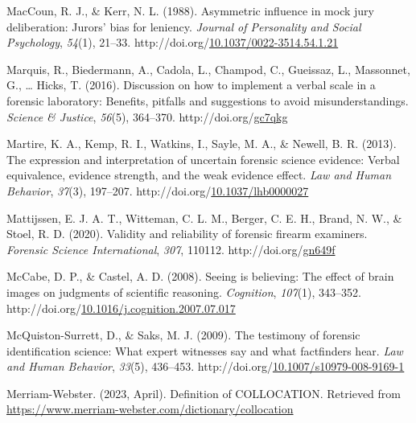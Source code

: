 \documentclass[print]{nuthesis}
\newlength{\cslhangindent}
\newenvironment{CSLReferences}[2]%
{\setlength{\parindent}{0pt}%
\everypar{\setlength{\hangindent}{\cslhangindent}}\ignorespaces}%
{\par}
\begin{document}
\begin{CSLReferences}{1}{0}
\leavevmode{}%
MacCoun, R. J., \& Kerr, N. L. (1988). Asymmetric influence in mock jury deliberation: {Jurors}' bias for leniency. \emph{Journal of Personality and Social Psychology}, \emph{54}(1), 21--33. http://doi.org/\href{https://doi.org/10.1037/0022-3514.54.1.21}{10.1037/0022-3514.54.1.21}

\leavevmode{}%
Marquis, R., Biedermann, A., Cadola, L., Champod, C., Gueissaz, L., Massonnet, G., \ldots{} Hicks, T. (2016). Discussion on how to implement a verbal scale in a forensic laboratory: {Benefits}, pitfalls and suggestions to avoid misunderstandings. \emph{Science \& Justice}, \emph{56}(5), 364--370. http://doi.org/\href{https://doi.org/gc7qkg}{gc7qkg}

\leavevmode{}%
Martire, K. A., Kemp, R. I., Watkins, I., Sayle, M. A., \& Newell, B. R. (2013). The expression and interpretation of uncertain forensic science evidence: {Verbal} equivalence, evidence strength, and the weak evidence effect. \emph{Law and Human Behavior}, \emph{37}(3), 197--207. http://doi.org/\href{https://doi.org/10.1037/lhb0000027}{10.1037/lhb0000027}

\leavevmode{}%
Mattijssen, E. J. A. T., Witteman, C. L. M., Berger, C. E. H., Brand, N. W., \& Stoel, R. D. (2020). Validity and reliability of forensic firearm examiners. \emph{Forensic Science International}, \emph{307}, 110112. http://doi.org/\href{https://doi.org/gn649f}{gn649f}

\leavevmode{}%
McCabe, D. P., \& Castel, A. D. (2008). Seeing is believing: {The} effect of brain images on judgments of scientific reasoning. \emph{Cognition}, \emph{107}(1), 343--352. http://doi.org/\href{https://doi.org/10.1016/j.cognition.2007.07.017}{10.1016/j.cognition.2007.07.017}

\leavevmode{}%
McQuiston-Surrett, D., \& Saks, M. J. (2009). The testimony of forensic identification science: {What} expert witnesses say and what factfinders hear. \emph{Law and Human Behavior}, \emph{33}(5), 436--453. http://doi.org/\href{https://doi.org/10.1007/s10979-008-9169-1}{10.1007/s10979-008-9169-1}

\leavevmode{}%
Merriam-Webster. (2023, April). Definition of {COLLOCATION}. Retrieved from \url{https://www.merriam-webster.com/dictionary/collocation}


\end{CSLReferences}
\end{document}
